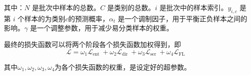 其中：\(N\) 是批次中样本的总数。\( C \) 是类别的总数。\(i\) 是批次中的样本索引。\(y_{i,c}\) 是第 \(i\) 个样本的为类别\( c \)的预测概率，\(\alpha_t\) 是一个调制因子，用于平衡正负样本之间的影响。\(\gamma\) 是一个调整参数，用于减少易分类样本的权重。



最终的损失函数可以将两个阶段各个损失函数加权得到，即
\begin{equation}
    \mathcal{L}=\omega_1\mathcal{L}_{\text {ent }}+\omega_2\mathcal{L}_{\text {dir }}+\omega_3\mathcal{L}_{\text {ser }}
    +\omega_4\mathcal{L}_{\text {FL }}
\end{equation}

其中$\omega_1,\omega_2,\omega_3,\omega_4$为各个损失函数的权重，是设定好的超参数。

